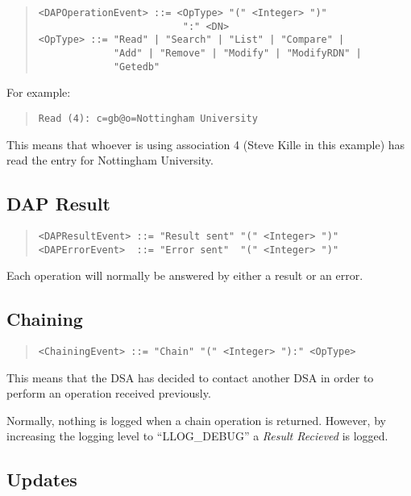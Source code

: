 \begin{quote}\begin{verbatim}
<DAPOperationEvent> ::= <OpType> "(" <Integer> ")"
                         ":" <DN>
<OpType> ::= "Read" | "Search" | "List" | "Compare" |
             "Add" | "Remove" | "Modify" | "ModifyRDN" |
             "Getedb"
\end{verbatim}\end{quote}

For example:

\begin{quote}\begin{verbatim}
Read (4): c=gb@o=Nottingham University
\end{verbatim}\end{quote}

This means that whoever is using association 4 (Steve Kille in this example)
has read the entry for Nottingham University.

\subsection{DAP Result}

\begin{quote}\begin{verbatim}
<DAPResultEvent> ::= "Result sent" "(" <Integer> ")"
<DAPErrorEvent>  ::= "Error sent"  "(" <Integer> ")"
\end{verbatim}\end{quote}

Each operation will normally be answered by either a result or an error.

\subsection{Chaining}

\begin{quote}\begin{verbatim}
<ChainingEvent> ::= "Chain" "(" <Integer> "):" <OpType>
\end{verbatim}\end{quote}

This means that the DSA has decided to contact another DSA in order to
perform an operation received previously.

Normally, nothing is logged when a chain operation is returned.
However, by increasing the logging level to ``LLOG\_DEBUG'' a
{\em Result Recieved} is logged.

\subsection{Updates}

